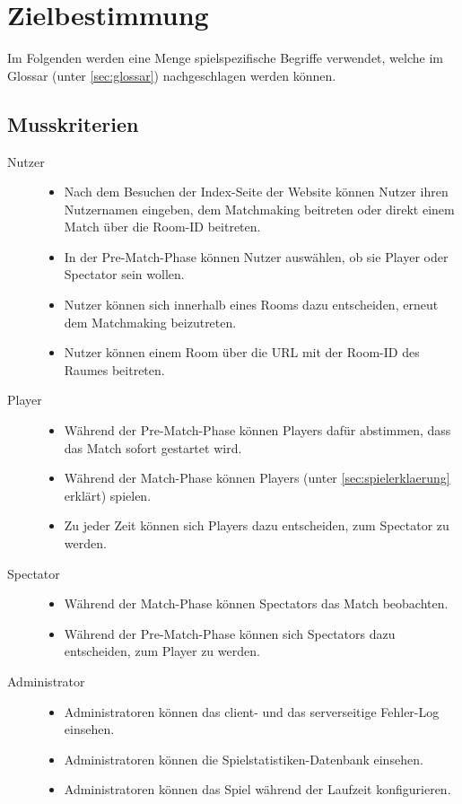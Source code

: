 \section{Zielbestimmung}

\newcommand{\crit}[2]{
	\item[#1] \hfill
		\begin{itemize}
			#2
		\end{itemize}
}

Im Folgenden werden eine Menge spielspezifische Begriffe verwendet, welche im Glossar (unter \ref{sec:glossar}) nachgeschlagen werden können.

\subsection{Musskriterien}
\begin{description}
	\crit{Nutzer}{
		\item Nach dem Besuchen der Index-Seite der Website können Nutzer ihren Nutzernamen eingeben, dem Matchmaking beitreten oder direkt einem Match über die Room-ID beitreten.
		\item In der Pre-Match-Phase können Nutzer auswählen, ob sie Player oder Spectator sein wollen.
		\item Nutzer können sich innerhalb eines Rooms dazu entscheiden, erneut dem Matchmaking beizutreten.
		\item Nutzer können einem Room über die URL mit der Room-ID des Raumes beitreten.
	}
	\crit{Player}{
		\item Während der Pre-Match-Phase können Players dafür abstimmen, dass das Match sofort gestartet wird.
		\item Während der Match-Phase können Players \vires (unter \ref{sec:spielerklaerung} erklärt) spielen.
		\item Zu jeder Zeit können sich Players dazu entscheiden, zum Spectator zu werden.
	}
	\crit{Spectator}{
		\item Während der Match-Phase können Spectators das Match beobachten.
		\item Während der Pre-Match-Phase können sich Spectators dazu entscheiden, zum Player zu werden.
	}
	\crit{Administrator}{
		\item Administratoren können das client- und das serverseitige Fehler-Log einsehen.
		\item Administratoren können die Spielstatistiken-Datenbank einsehen.
		\item Administratoren können das Spiel während der Laufzeit konfigurieren.
	}
\end{description}

